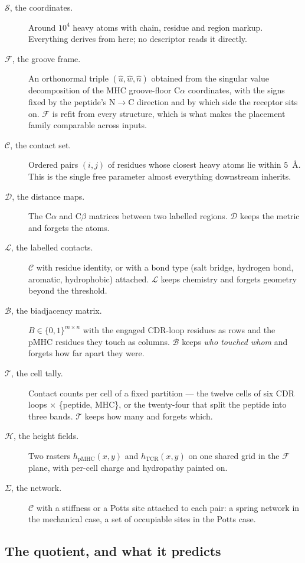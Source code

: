 \documentclass[11pt,a4paper]{article}
\newcommand{\obj}[1]{\ensuremath{\mathcal{#1}}}
\begin{document}
\begin{description}
\item[\obj{S}, the coordinates.] Around $10^4$ heavy atoms with chain, residue and region markup.
  Everything derives from here; no descriptor reads it directly.
\item[\obj{F}, the groove frame.] An orthonormal triple $(\hat u, \hat w, \hat n)$ obtained from the
  singular value decomposition of the MHC groove-floor C$\alpha$ coordinates, with the signs fixed
  by the peptide's N$\to$C direction and by which side the receptor sits on. \obj{F} is refit from
  every structure, which is what makes the placement family comparable across inputs.
\item[\obj{C}, the contact set.] Ordered pairs $(i,j)$ of residues whose closest heavy atoms lie
  within $5$~\AA. This is the single free parameter almost everything downstream inherits.
\item[\obj{D}, the distance maps.] The C$\alpha$ and C$\beta$ matrices between two labelled regions.
  \obj{D} keeps the metric and forgets the atoms.
\item[\obj{L}, the labelled contacts.] \obj{C} with residue identity, or with a bond type
  (salt bridge, hydrogen bond, aromatic, hydrophobic) attached. \obj{L} keeps chemistry and forgets
  geometry beyond the threshold.
\item[\obj{B}, the biadjacency matrix.] $B \in \{0,1\}^{m \times n}$ with the engaged CDR-loop
  residues as rows and the pMHC residues they touch as columns. \obj{B} keeps \emph{who touched
  whom} and forgets how far apart they were.
\item[\obj{T}, the cell tally.] Contact counts per cell of a fixed partition --- the twelve cells of
  six CDR loops $\times$ \{peptide, MHC\}, or the twenty-four that split the peptide into three
  bands. \obj{T} keeps how many and forgets which.
\item[\obj{H}, the height fields.] Two rasters $h_{\mathrm{pMHC}}(x,y)$ and $h_{\mathrm{TCR}}(x,y)$
  on one shared grid in the $\obj{F}$ plane, with per-cell charge and hydropathy painted on.
\item[$\Sigma$, the network.] \obj{C} with a stiffness or a Potts site attached to each pair: a
  spring network in the mechanical case, a set of occupiable sites in the Potts case.
\end{description}

\subsection{The quotient, and what it predicts}
\label{sec:quotient}
\end{document}
